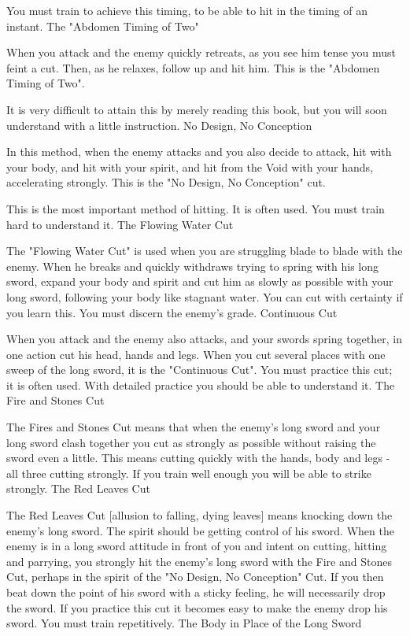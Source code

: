 You must train to achieve this timing, to be able to hit in the timing of an instant.
The "Abdomen Timing of Two"

When you attack and the enemy quickly retreats, as you see him tense you must feint a cut. Then, as he relaxes, follow up and hit him. This is the "Abdomen Timing of Two".

It is very difficult to attain this by merely reading this book, but you will soon understand with a little instruction.
No Design, No Conception

In this method, when the enemy attacks and you also decide to attack, hit with your body, and hit with your spirit, and hit from the Void with your hands, accelerating strongly. This is the "No Design, No Conception" cut.

This is the most important method of hitting. It is often used. You must train hard to understand it.
The Flowing Water Cut

The "Flowing Water Cut" is used when you are struggling blade to blade with the enemy. When he breaks and quickly withdraws trying to spring with his long sword, expand your body and spirit and cut him as slowly as possible with your long sword, following your body like stagnant water. You can cut with certainty if you learn this. You must discern the enemy's grade.
Continuous Cut

When you attack and the enemy also attacks, and your swords spring together, in one action cut his head, hands and legs. When you cut several places with one sweep of the long sword, it is the "Continuous Cut". You must practice this cut; it is often used. With detailed practice you should be able to understand it.
The Fire and Stones Cut

The Fires and Stones Cut means that when the enemy's long sword and your long sword clash together you cut as strongly as possible without raising the sword even a little. This means cutting quickly with the hands, body and legs - all three cutting strongly. If you train well enough you will be able to strike strongly.
The Red Leaves Cut

The Red Leaves Cut [allusion to falling, dying leaves] means knocking down the enemy's long sword. The spirit should be getting control of his sword. When the enemy is in a long sword attitude in front of you and intent on cutting, hitting and parrying, you strongly hit the enemy's long sword with the Fire and Stones Cut, perhaps in the spirit of the "No Design, No Conception" Cut. If you then beat down the point of his sword with a sticky feeling, he will necessarily drop the sword. If you practice this cut it becomes easy to make the enemy drop his sword. You must train repetitively.
The Body in Place of the Long Sword

